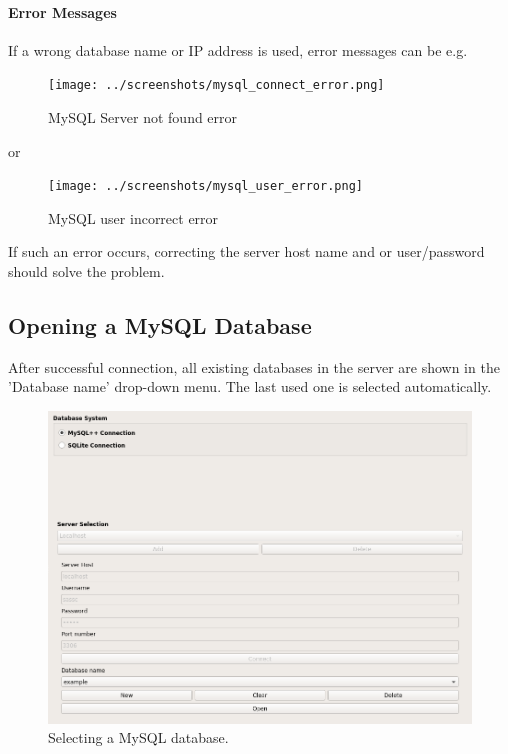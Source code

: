 \paragraph{Error Messages}

If a wrong database name or IP address is used, error messages can be e.g. \\

\begin{figure}[H]
  \center
    \texttt{[image: ../screenshots/mysql\_connect\_error.png]}
  \caption{MySQL Server not found error}
\end{figure}

 or 

\begin{figure}[H]
  \center
    \texttt{[image: ../screenshots/mysql\_user\_error.png]}
  \caption{MySQL user incorrect error}
\end{figure}

If such an error occurs, correcting the server host name and or user/password should solve the problem. 


\subsection{Opening a MySQL Database}
\label{sec:mysql_open_db}

After successful connection, all existing databases in the server are shown in the 'Database name' drop-down menu. The last used one is selected automatically.

\begin{figure}[H]
  \center
    \includegraphics[width=16cm,frame]{../screenshots/mysql_database_selection.png}
  \caption{Selecting a MySQL database.}
  \label{fig:mysql_db_select}
\end{figure}


